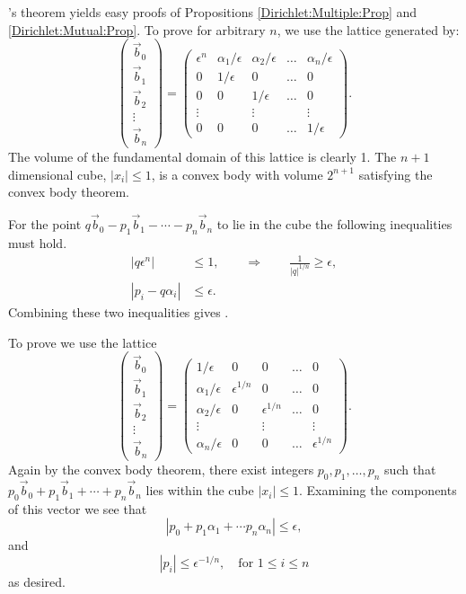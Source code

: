 {\Minkowski}'s theorem yields easy proofs of Propositions
\ref{Dirichlet:Multiple:Prop} and \ref{Dirichlet:Mutual:Prop}.  
To prove  for arbitrary $n$, we use
the lattice generated by:
\[
\left(\begin {array}{c} 
  \vec{b}_0 \\ \vec{b}_1 \\ \vec{b}_2 \\ \vdots \\ \vec{b}_n 
\end{array}\right)
=
\left(\begin {array}{ccccc}
  \epsilon^n & \alpha_1/\epsilon & \alpha_2/\epsilon & 
    \ldots & \alpha_n/\epsilon \\
  0 & 1/\epsilon & 0 & \ldots & 0 \\
  0 & 0 & 1/\epsilon & \ldots & 0 \\
  \vdots  & & \vdots & &\vdots \\
  0 & 0 & 0 & \ldots & 1/\epsilon
\end{array}
\right).
\]
The volume of the fundamental domain of this lattice is clearly 1.
The $n+1$ dimensional cube, $|x_i| \le 1$, is a convex body with
volume $2^{n+1}$ satisfying the convex body theorem.

For the point $q \vec{b}_0 - p_1 \vec{b}_1 - \cdots - p_n \vec{b}_n$
to lie in the cube the following inequalities must hold.
\[
\begin{aligned}
|q\epsilon^n| &\le 1, \qquad \Longrightarrow\qquad 
    \frac{1}{|q|^{1/n}} \ge \epsilon, \\
|p_i - q \alpha_i| &\le \epsilon.
\end{aligned}
\]
Combining these two inequalities gives 
.

To prove  we use the lattice
\begin{equation} \label{Dirichlet:Lattice:Eq}
\left(
\begin{array}{c}
  \vec{b}_0 \\ \vec{b}_1 \\ \vec{b}_2 \\ \vdots \\ \vec{b}_n
\end{array}\right) =
\left(\begin{array}{cccccc}
1/\epsilon &  0 & 0 & \ldots & 0 \\
\alpha_1/\epsilon & \epsilon^{1/n} & 0 & \ldots & 0 \\
\alpha_2/\epsilon & 0 & \epsilon^{1/n} & \ldots & 0  \\
\vdots  & & \vdots & & \vdots \\
\alpha_n/\epsilon & 0 & 0 & \ldots & \epsilon^{1/n}
\end{array}\right).
\end{equation}
Again by the convex body theorem, there exist integers $p_0, p_1,
\ldots, p_n$ such that $p_0 \vec{b}_0 + p_1 \vec{b}_1 + \cdots + p_n
\vec{b}_n$ lies within the cube $|x_i| \le 1$.  Examining the
components of this vector we see that
\[
\left| p_0 + p_1 \alpha_1 + \cdots p_n \alpha_n\right| \le \epsilon,
\]
and 
\[
\left|p_i\right| \le \epsilon^{-1/n}, \quad \mbox{for $1 \le i \le n$}
\]
as desired.

